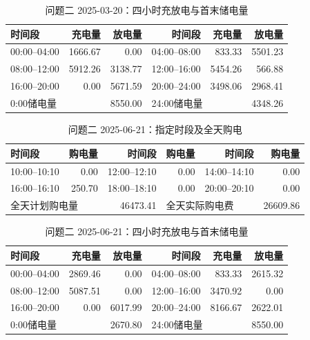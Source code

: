 \begin{table}[htbp]\centering\scriptsize
\caption{问题二 2025-03-20：四小时充放电与首末储电量}
\begin{tabular}{lrrrrr}\toprule
时间段 & 充电量 & 放电量 & 时间段 & 充电量 & 放电量\\\midrule
00:00--04:00 & 1666.67 & 0.00 & 04:00--08:00 & 833.33 & 5501.23\\
08:00--12:00 & 5912.26 & 3138.77 & 12:00--16:00 & 5454.26 & 566.88\\
16:00--20:00 & 0.00 & 5671.59 & 20:00--24:00 & 3498.06 & 2968.41\\
\multicolumn{2}{l}{0:00储电量} & 8550.00 & \multicolumn{2}{l}{24:00储电量} & 4348.26\\
\bottomrule\end{tabular}\end{table}

\FloatBarrier
\begin{table}[htbp]\centering\scriptsize
\caption{问题二 2025-06-21：指定时段及全天购电}
\begin{tabular}{lrrrrr}\toprule
时间段 & 购电量 & 时间段 & 购电量 & 时间段 & 购电量\\\midrule
10:00--10:10 & 0.00 & 12:00--12:10 & 0.00 & 14:00--14:10 & 0.00\\
16:00--16:10 & 250.70 & 18:00--18:10 & 0.00 & 20:00--20:10 & 0.00\\
\multicolumn{2}{l}{全天计划购电量} & 46473.41 & \multicolumn{2}{l}{全天实际购电费} & 26609.86\\
\bottomrule\end{tabular}\end{table}

\begin{table}[htbp]\centering\scriptsize
\caption{问题二 2025-06-21：四小时充放电与首末储电量}
\begin{tabular}{lrrrrr}\toprule
时间段 & 充电量 & 放电量 & 时间段 & 充电量 & 放电量\\\midrule
00:00--04:00 & 2869.46 & 0.00 & 04:00--08:00 & 833.33 & 2615.32\\
08:00--12:00 & 5087.51 & 0.00 & 12:00--16:00 & 3470.92 & 0.00\\
16:00--20:00 & 0.00 & 6017.99 & 20:00--24:00 & 8166.67 & 2622.01\\
\multicolumn{2}{l}{0:00储电量} & 2670.80 & \multicolumn{2}{l}{24:00储电量} & 8550.00\\
\bottomrule\end{tabular}\end{table}

